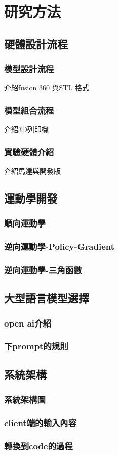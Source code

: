 \documentclass[class=NCU_thesis, crop=false]{standalone}
\begin{document}
\chapter{研究方法}

\section{硬體設計流程}
\subsection{模型設計流程}
介紹fusion 360 與STL 格式
\subsection{模型組合流程}
介紹3D列印機
\subsection{實驗硬體介紹}
介紹馬達與開發版

\section{運動學開發}
\subsection{順向運動學}
\subsection{逆向運動學-Policy-Gradient}
\subsection{逆向運動學-三角函數}

\section{大型語言模型選擇}
\subsection{open ai介紹}
\subsection{下prompt的規則}

\section{系統架構}
\subsection{系統架構圖}
\subsection{client端的輸入內容}
\subsection{轉換到code的過程}
\end{document}
